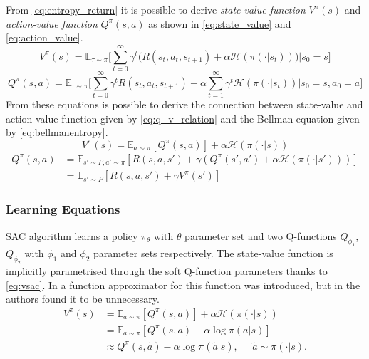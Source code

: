 From \vref{eq:entropy_return} it is possible to derive \textit{state-value function} $V^\pi(s)$ and \textit{action-value function} $Q^\pi(s,a)$ as shown in \vref{eq:state_value} and \vref{eq:action_value}.
\begin{equation} \label{eq:state_value}
	V^\pi(s) = \mathbb{E}_{\tau \sim \pi}\Bigg[\sum_{t=0}^{\infty} \gamma^t \bigg(R(s_t, a_t, s_{t+1}) + \alpha \mathcal{H}(\pi(\cdot|s_t))\bigg)\bigg|s_0 = s\Bigg]
\end{equation}
\begin{equation} \label{eq:action_value}
	Q^\pi(s,a) = \mathbb{E}_{\tau \sim \pi}\Bigg[\sum_{t=0}^{\infty} \gamma^t R(s_t, a_t, s_{t+1}) + \alpha \sum_{t=1}^{\infty} \gamma^t \mathcal{H}(\pi(\cdot|s_t))\bigg|s_0 = s, a_0 =a\Bigg]
\end{equation}
From these equations is possible to derive the connection between state-value and action-value function given by \vref{eq:q_v_relation} and the Bellman equation given by \vref{eq:bellmanentropy}.
\begin{equation} \label{eq:q_v_relation}
	V^\pi(s) = \mathbb{E}_{a\sim\pi}[Q^\pi(s,a)] + \alpha \mathcal{H}(\pi(\cdot|s))
\end{equation}
\begin{equation}
	\begin{aligned} 	\label{eq:bellmanentropy}
		Q^\pi(s,a) & = \mathbb{E}_{s'\sim P, a'\sim\pi}[R(s,a,s') + \gamma(Q^\pi(s',a') + \alpha \mathcal{H}(\pi(\cdot|s')))] \\
		           & = \mathbb{E}_{s'\sim P}[R(s,a,s') + \gamma V^\pi(s')]
	\end{aligned}
\end{equation}

\subsubsection{Learning Equations}
SAC algorithm learns a policy $\pi_\theta$ with $\theta$ parameter set and two Q-functions $Q_{\phi_1}$,  $Q_{\phi_2}$ with $\phi_1$ and $\phi_2$ parameter sets respectively.
The state-value function is implicitly parametrised through the soft Q-function parameters thanks to \vref{eq:vsac}.
In \cite{haarnoja2018soft} a function approximator for this function was introduced, but in \cite{haarnoja2018alg} the authors found it to be unnecessary.
\begin{equation} \label{eq:vsac}
	\begin{aligned}
		V^{\pi}(s) & = \mathbb{E}_{a \sim \pi}[Q^{\pi}(s,a)] + \alpha \mathcal{H} \left(\pi(\cdot|s)\right)               \\
		           & = \mathbb{E}_{a \sim \pi}[Q^{\pi}(s,a) - \alpha \log \pi(a|s)]                                       \\
		           & \approx Q^{\pi}(s,\tilde{a}) - \alpha \log \pi(\tilde{a}|s), \;\;\;\;\; \tilde{a} \sim \pi(\cdot|s).
	\end{aligned}
\end{equation}

